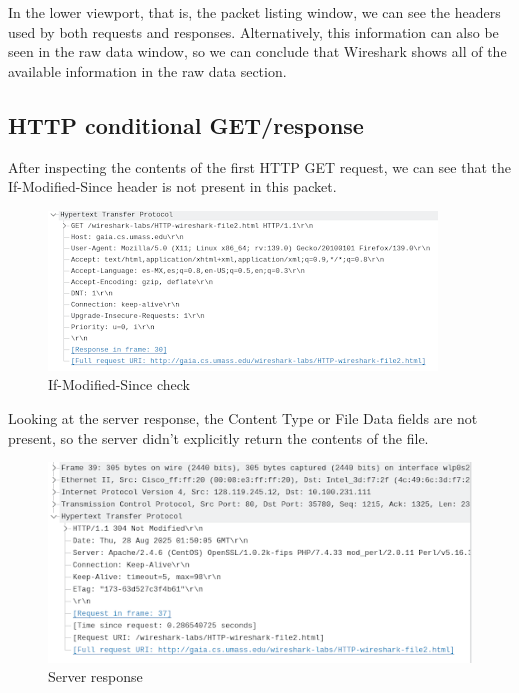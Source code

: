 In the lower viewport, that is, the packet listing window, we can see the
headers used by both requests and responses. Alternatively, this information
can also be seen in the raw data window, so we can conclude that Wireshark
shows all of the available information in the raw data section.

\subsection{HTTP conditional GET/response}
After inspecting the contents of the first HTTP GET request, we can see that
the If-Modified-Since header is not present in this packet.

\begin{figure}[htbp]
    \centering
    \includegraphics[width=1\linewidth]{img/7.png}
    \caption{If-Modified-Since check}\label{fig:7}
\end{figure}

Looking at the server response, the Content Type or File Data fields are not
present, so the server didn't explicitly return the contents of the file.

\begin{figure}[htbp]
    \centering
    \includegraphics[width=1\linewidth]{img/8.png}
    \caption{Server response}\label{fig:8}
\end{figure}

